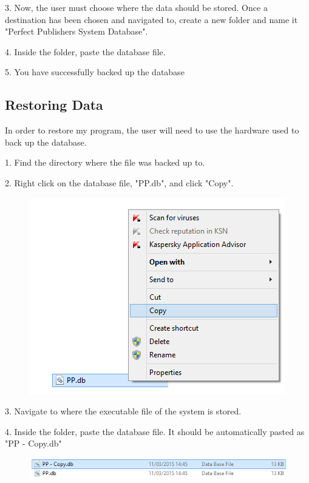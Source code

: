 3. Now, the user must choose where the data should be stored. Once a destination has been chosen and navigated to, create a new folder and name it "Perfect Publishers System Database".

4. Inside the folder, paste the database file.

5. You have successfully backed up the database

\subsection{Restoring Data}

In order to restore my program, the user will need to use the hardware used to back up the database.

1. Find the directory where the file was backed up to.

2. Right click on the database file, "PP.db", and click "Copy".

\begin{figure}[H]
    \includegraphics[width=\textwidth]{./Manual/CopyBackup.png}
\end{figure}

3. Navigate to where the executable file of the system is stored.

4. Inside the folder, paste the database file. It should be automatically pasted as "PP - Copy.db"

\begin{figure}[H]
    \includegraphics[width=\textwidth]{./Manual/CopiedFile.png}
\end{figure}


